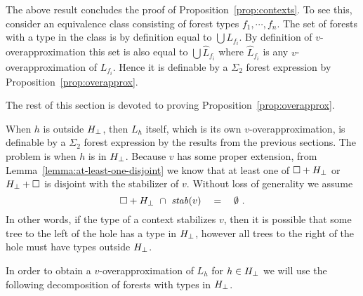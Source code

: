 \documentclass{LMCS}
\begin{document}
\newcommand{\overap}[1]{\hat{#1}} The above result concludes
the proof of Proposition~\ref{prop:contexts}. To see this, consider an equivalence
class consisting of forest types $f_1,\cdots,f_n$. The set of
forests with a type in the class is by definition equal to
$\bigcup L_{f_i}$. By definition of $v$-overapproximation this
set is also equal to $\bigcup \overap L_{f_i}$ where $\overap
L_{f_i}$ is any $v$-overapproximation of $L_{f_i}$. Hence it is definable by a
$\Sigma_2$ forest expression by Proposition~\ref{prop:overapprox}.

The rest of this section is devoted to proving
Proposition~\ref{prop:overapprox}. 

When $h$ is outside ${H_\bot}$, then $L_h$ itself, which is its own
$v$-overapproximation, is definable by a $\Sigma_2$ forest expression
by the results from the previous sections. The problem is when $h$ is
in ${H_\bot}$.  Because $v$ has some proper extension, from
Lemma~\ref{lemma:at-least-one-disjoint} we know that at least one of  $\Box +
{H_\bot}$ or ${H_\bot} + \Box$ is disjoint with the stabilizer of $
v$. Without loss of generality we assume
\begin{equation}
  \label{eq:assumption-left}
  \Box + {H_\bot} \  \cap\  \mathit{stab}(v) \quad  = \quad 
  \emptyset\ .
\end{equation}
In other words, if the type of a context stabilizes $v$, then it is
possible that some tree to the left of the hole has a type in ${H_\bot}$,
however all trees to the right of the hole must have types outside ${H_\bot}$.

In order to obtain a $v$-overapproximation of $L_h$ for $h \in {H_\bot}$ we
will use the following decomposition of forests with types in ${H_\bot}$.
\end{document}
